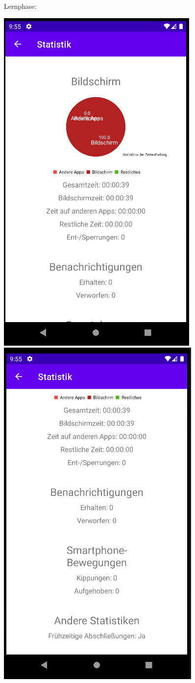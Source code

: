 \documentclass[ngerman]{tutorial}
\begin{document}
\centering Lernphase:\nobreak
\begin{center}
    \includegraphics[scale=0.45]{stats_phase_1.png}\quad
    \includegraphics[scale=0.45]{stats_phase_2.png}

\end{center}
\end{document}
